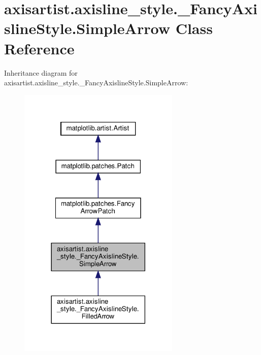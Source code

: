 \hypertarget{classaxisartist_1_1axisline__style_1_1__FancyAxislineStyle_1_1SimpleArrow}{}\section{axisartist.\+axisline\+\_\+style.\+\_\+\+Fancy\+Axisline\+Style.\+Simple\+Arrow Class Reference}
\label{classaxisartist_1_1axisline__style_1_1__FancyAxislineStyle_1_1SimpleArrow}


Inheritance diagram for axisartist.\+axisline\+\_\+style.\+\_\+\+Fancy\+Axisline\+Style.\+Simple\+Arrow\+:
\nopagebreak
\begin{figure}[H]
\begin{center}
\leavevmode
\includegraphics[width=218pt]{classaxisartist_1_1axisline__style_1_1__FancyAxislineStyle_1_1SimpleArrow__inherit__graph}
\end{center}
\end{figure}


